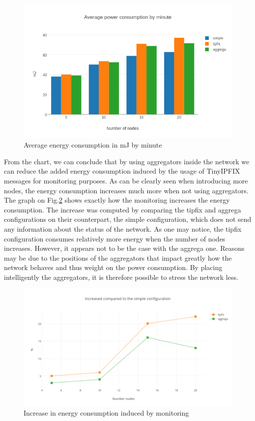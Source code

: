 \begin{figure}[h]
  \centering
  \includegraphics[width=\textwidth]{res/average_energy.png}
  \caption{Average energy consumption in mJ by minute}
  \label{fig:average_energy}
\end{figure}

From the chart, we can conclude that by using aggregators inside the network we can reduce the added energy consumption induced by the usage of TinyIPFIX messages for monitoring purposes. As can be clearly seen when introducing more nodes, the energy consumption increases much more when not using aggregators. The graph on Fig.\ref{fig:increase_energy} shows exactly how the monitoring increases the energy consumption. The increase was computed by comparing the tipfix and aggrega configurations on their counterpart, the simple configuration, which does not send any information about the status of the network. As one may notice, the tipfix configuration consumes relatively more energy when the number of nodes increases. However, it appears not to be the case with the aggrega one. Reasons may be due to the positions of the aggregators that impact greatly how the network behaves and thus weight on the power consumption. By placing intelligently the aggregators, it is therefore possible to stress the network less.\\

\begin{figure}[h]
  \includegraphics[width=\textwidth]{res/increase_energy.png}
  \caption{Increase in energy consumption induced by monitoring}
  \label{fig:increase_energy}
\end{figure}

